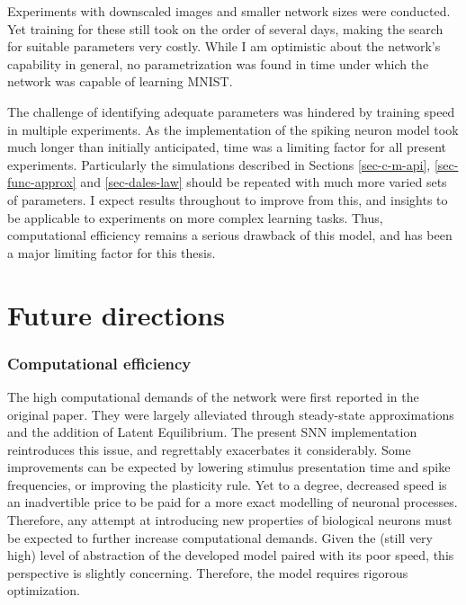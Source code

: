 Experiments with downscaled images and smaller network sizes were conducted. Yet training for these still took on the
order of several days, making the search for suitable parameters very costly. While I am optimistic about the network's
capability in general, no parametrization was found in time under which the network was capable of learning MNIST. 


The challenge of identifying adequate parameters was hindered by training speed in multiple experiments. As the
implementation of the spiking neuron model took much longer than initially anticipated, time was a limiting factor for
all present experiments. Particularly the simulations described in Sections \ref{sec-c-m-api}, \ref{sec-func-approx} and
\ref{sec-dales-law} should be repeated with much more varied sets of parameters. I expect results throughout to improve
from this, and insights to be applicable to experiments on more complex learning tasks. Thus, computational efficiency
remains a serious drawback of this model, and has been a major limiting factor for this thesis.


\section{Future directions}

\subsubsection*{Computational efficiency}

The high computational demands of the network were first reported in the original paper. They were largely alleviated
through steady-state approximations and the addition of Latent Equilibrium. The present SNN implementation reintroduces
this issue, and regrettably exacerbates it considerably. Some improvements can be expected by lowering stimulus
presentation time and spike frequencies, or improving the plasticity rule. Yet to a degree, decreased speed is an
inadvertible price to be paid for a more exact modelling of neuronal processes. Therefore, any attempt at introducing
new properties of biological neurons must be expected to further increase computational demands. Given the (still very
high) level of abstraction of the developed model paired with its poor speed, this perspective is slightly concerning.
Therefore, the model requires rigorous optimization.

